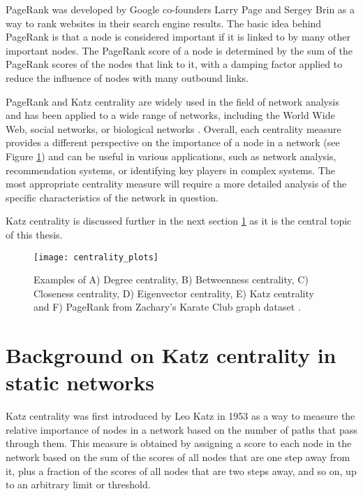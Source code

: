 PageRank was developed by Google co-founders Larry Page and Sergey Brin as a way to rank websites in their search engine results. The basic idea behind PageRank is that a node is considered important if it is linked to by many other important nodes. The PageRank score of a node is determined by the sum of the PageRank scores of the nodes that link to it, with a damping factor applied to reduce the influence of nodes with many outbound links. 

PageRank and Katz centrality are widely used in the field of network analysis and has been applied to a wide range of networks, including the World Wide Web, social networks, or biological networks \cite{brin1998anatomy,jeong2001lethality,wasserman1994social}. Overall, each centrality measure provides a different perspective on the importance of a node in a network (see Figure \ref{centrality}) and can be useful in various applications, such as network analysis, recommendation systems, or identifying key players in complex systems. The most appropriate centrality measure will require a more detailed analysis of the specific characteristics of the network in question.

Katz centrality is discussed further in the next section \ref{sec:back} as it is the central topic of this thesis.

\begin{figure}[h]\centering
	\texttt{[image: centrality\_plots]}
	\caption{Examples of A) Degree centrality, B) Betweenness centrality, C) Closeness centrality, D) Eigenvector centrality, E) Katz centrality and F) PageRank from Zachary’s Karate Club graph dataset \cite{zachary1977information}.}
	\label{centrality}
	\bigskip
\end{figure}

\section{Background on Katz centrality in static networks}
\label{sec:back}

Katz centrality was first introduced by Leo Katz \cite{katz1953new} in 1953 as a way to measure the relative importance of nodes in a network based on the number of paths that pass through them. This measure is obtained by assigning a score to each node in the network based on the sum of the scores of all nodes that are one step away from it, plus a fraction of the scores of all nodes that are two steps away, and so on, up to an arbitrary limit or threshold.

